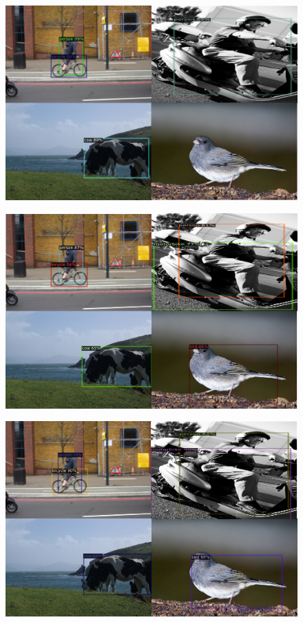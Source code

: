 \documentclass{article}
\begin{document}
\begin{figure}[h!]
  \begin{minipage}{0.47\textwidth}
  \includegraphics[width=\textwidth, height=0.17\textheight]{./../../figures/1shot pascal.png}
  \label{1 Shot}
  \end{minipage}
  \begin{minipage}{0.47\textwidth}
  \includegraphics[width=\textwidth, height=0.17\textheight]{./../../figures/5shot pascal.png}
  \label{5 Shot}
  \end{minipage}
  \begin{minipage}{0.47\textwidth}
  \includegraphics[width=\textwidth, height=0.17\textheight]{./../../figures/10shot pascal.png}

\end{minipage}
\end{figure}
\end{document}
